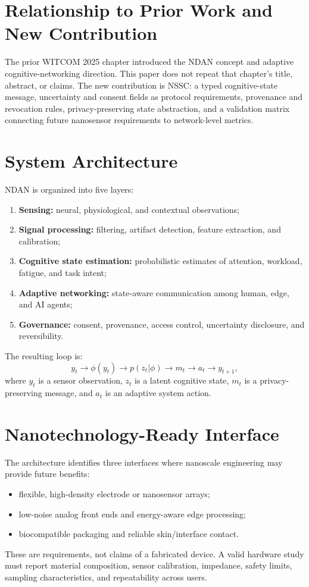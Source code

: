 \documentclass[sigconf]{acmart}
\begin{document}
\section{Relationship to Prior Work and New Contribution}

The prior WITCOM 2025 chapter introduced the NDAN concept and adaptive cognitive-networking direction. This paper does not repeat that chapter's title, abstract, or claims. The new contribution is NSSC: a typed cognitive-state message, uncertainty and consent fields as protocol requirements, provenance and revocation rules, privacy-preserving state abstraction, and a validation matrix connecting future nanosensor requirements to network-level metrics.

\section{System Architecture}
NDAN is organized into five layers:
\begin{enumerate}
\item \textbf{Sensing:} neural, physiological, and contextual observations;
\item \textbf{Signal processing:} filtering, artifact detection, feature extraction, and calibration;
\item \textbf{Cognitive state estimation:} probabilistic estimates of attention, workload, fatigue, and task intent;
\item \textbf{Adaptive networking:} state-aware communication among human, edge, and AI agents;
\item \textbf{Governance:} consent, provenance, access control, uncertainty disclosure, and reversibility.
\end{enumerate}

The resulting loop is:
\begin{equation}
 y_t \rightarrow \phi(y_t) \rightarrow p(z_t|\phi) \rightarrow m_t \rightarrow a_t \rightarrow y_{t+1},
\end{equation}
where $y_t$ is a sensor observation, $z_t$ is a latent cognitive state, $m_t$ is a privacy-preserving message, and $a_t$ is an adaptive system action.

\section{Nanotechnology-Ready Interface}
The architecture identifies three interfaces where nanoscale engineering may provide future benefits:
\begin{itemize}
\item flexible, high-density electrode or nanosensor arrays;
\item low-noise analog front ends and energy-aware edge processing;
\item biocompatible packaging and reliable skin/interface contact.
\end{itemize}
These are requirements, not claims of a fabricated device. A valid hardware study must report material composition, sensor calibration, impedance, safety limits, sampling characteristics, and repeatability across users.
\end{document}
